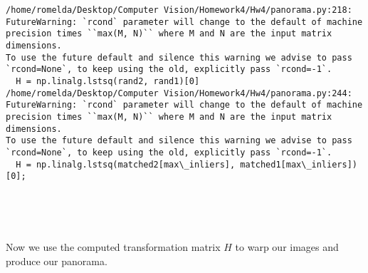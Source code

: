 \documentclass[11pt]{article}
\begin{document}
    \begin{Verbatim}[commandchars=\\\{\}]
/home/romelda/Desktop/Computer Vision/Homework4/Hw4/panorama.py:218: FutureWarning: `rcond` parameter will change to the default of machine precision times ``max(M, N)`` where M and N are the input matrix dimensions.
To use the future default and silence this warning we advise to pass `rcond=None`, to keep using the old, explicitly pass `rcond=-1`.
  H = np.linalg.lstsq(rand2, rand1)[0]
/home/romelda/Desktop/Computer Vision/Homework4/Hw4/panorama.py:244: FutureWarning: `rcond` parameter will change to the default of machine precision times ``max(M, N)`` where M and N are the input matrix dimensions.
To use the future default and silence this warning we advise to pass `rcond=None`, to keep using the old, explicitly pass `rcond=-1`.
  H = np.linalg.lstsq(matched2[max\_inliers], matched1[max\_inliers])[0];

    \end{Verbatim}

    \begin{center}
    \end{center}
    { \hspace*{\fill} \\}
    
    \begin{center}
    \end{center}
    { \hspace*{\fill} \\}
    
    Now we use the computed transformation matrix \(H\) to warp our images
and produce our panorama.
\end{document}
